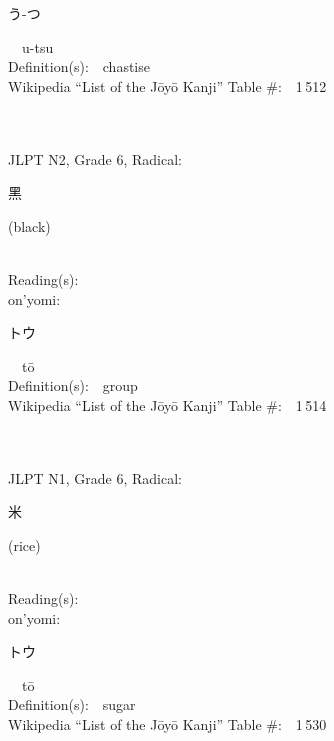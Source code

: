 \begin{multicols}{2}
{\hspace*{2em}}{\begin{CJK}{UTF8}{min} う-つ \end{CJK}}\ \ u-tsu\ \ \\
Definition(s):\ \ chastise \\
Wikipedia ``List of the J\=oy\=o Kanji'' Table \#:\ \ 1\,512 \\
\ \ \\
{\fontsize{34pt}{40pt}  }\ \ \\  %
{JLPT N2, Grade 6, Radical:\ \ {\begin{CJK}{UTF8}{min} 黑 \end{CJK}} (black) } \\
Reading(s):\ \ \\
{\hspace*{1em}}on'yomi:\ \ \\
{\hspace*{2em}}{\begin{CJK}{UTF8}{min} トウ \end{CJK}}\ \ t\=o\ \ \\
Definition(s):\ \ group \\
Wikipedia ``List of the J\=oy\=o Kanji'' Table \#:\ \ 1\,514 \\
\ \ \\
{\fontsize{34pt}{40pt}  }\ \ \\  %
{JLPT N1, Grade 6, Radical:\ \ {\begin{CJK}{UTF8}{min} 米 \end{CJK}} (rice) } \\
Reading(s):\ \ \\
{\hspace*{1em}}on'yomi:\ \ \\
{\hspace*{2em}}{\begin{CJK}{UTF8}{min} トウ \end{CJK}}\ \ t\=o\ \ \\
Definition(s):\ \ sugar \\
Wikipedia ``List of the J\=oy\=o Kanji'' Table \#:\ \ 1\,530 \\
\ \ \\

\end{multicols}

